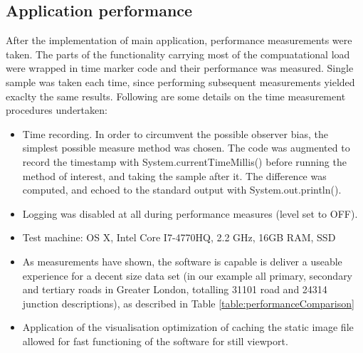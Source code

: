 \subsection{Application performance}
After the implementation of main application, performance measurements were taken. The parts of the functionality carrying most of the compuatational load were wrapped in time marker code and their performance was measured. Single sample was taken each time, since performing subsequent measurements yielded exaclty the same results. Following are some details on the time measurement procedures undertaken:

\begin{itemize}
    \item Time recording. In order to circumvent the possible observer bias, the simplest possible measure method was chosen. The code was augmented to record the timestamp with System.currentTimeMillis() before running the method of interest, and taking the sample after it. The difference was computed, and echoed to the standard output with System.out.println().
    \item Logging was disabled at all during performance measures (level set to OFF).
    \item Test machine: OS X, Intel Core I7-4770HQ, 2.2 GHz, 16GB RAM, SSD
    \item As measurements have shown, the software is capable is deliver a useable experience for a decent size data set (in our example all primary, secondary and tertiary roads in Greater London, totalling 31101 road and 24314 junction descriptions), as described in Table \ref{table:performanceComparison}
    \item Application of the visualisation optimization of caching the static image file allowed for fast functioning of the software for still viewport.
\end{itemize}

